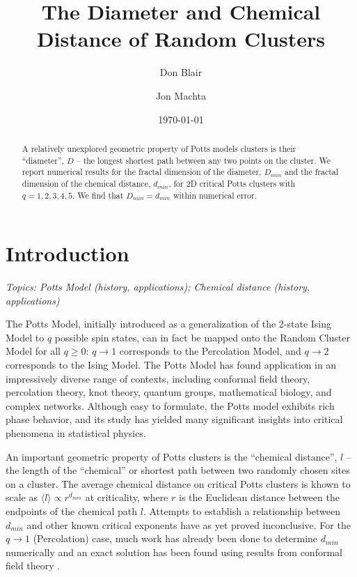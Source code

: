 \documentclass[pre,preprint]{revtex4-1}
\begin{document}
\title{The Diameter and Chemical Distance of Random Clusters}

\author{Don Blair}
\author{Jon Machta}

\date{\today}


\begin{abstract}
 A relatively unexplored geometric property of Potts models clusters is their ``diameter'', $D$ -- the longest shortest path between any two points on the cluster. We report numerical results for the fractal dimension of the diameter, $D_{min}$ and the fractal dimension of the chemical distance, $d_{min}$, for 2D critical Potts clusters with $q=1,2,3,4,5$. We find that $D_{min} = d_{min}$ within numerical error.
\end{abstract}

\maketitle 

\section{Introduction} %

{\it Topics: Potts Model (history, applications);  Chemical distance (history, applications)}

The Potts Model, initially introduced as a generalization of the 2-state Ising Model to $q$ possible spin states, can in fact be mapped onto the Random Cluster Model for all $q \ge 0$: $q \to 1$ corresponds to the Percolation Model, and $q \to 2$ corresponds to the Ising Model.  The Potts Model has found application in an impressively diverse range of contexts, including conformal field theory, percolation theory, knot theory, quantum groups, mathematical biology, and complex networks. Although easy to formulate, the Potts model exhibits rich phase behavior, and its study has yielded many significant insights into critical phenomena in statistical physics.

An important geometric property of Potts clusters is the ``chemical distance'', $l$ -- the length of the ``chemical'' or shortest path between two randomly chosen sites on a cluster.  The average chemical distance on critical Potts clusters is khown to scale as $\langle l \rangle \propto r^{d_{min}}$ at criticality, where $r$ is the Euclidean distance between the endpoints of the chemical path $l$. Attempts to establish a relationship between $d_{min}$ and other known critical exponents have as yet proved inconclusive.  For the $q \to 1$ (Percolation) case, much work has already been done to determine $d_{min}$ numerically \cite{Gr83, HrSt88} and an exact solution has been found using results from conformal field theory \cite{Zi99}.
\end{document}
